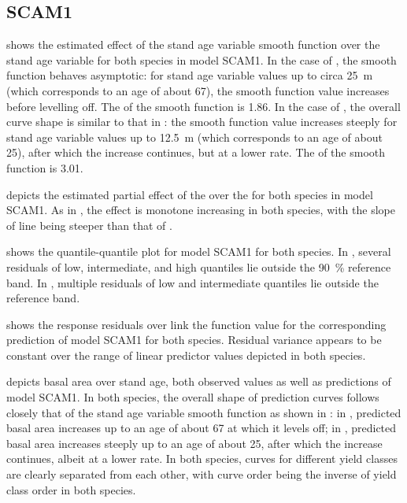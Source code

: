 \subsection{SCAM1}

 shows the estimated effect of the stand age variable smooth function over the stand age variable for both species in model SCAM1.  In the case of \Beech{}, the smooth function behaves asymptotic:  for stand age variable values up to circa \SI{25}{\meter} (which corresponds to an age of about \SI{67}{\year}), the smooth function value increases before levelling off.  The \edf{} of the smooth function is \num{1.86}.  In the case of \Spruce{}, the overall curve shape is similar to that in :  the smooth function value increases steeply for stand age variable values up to \SI{12.5}{\meter} (which corresponds to an age of about \SI{25}{\year}), after which the increase continues, but at a lower rate.  The \edf{} of the smooth function is \num{3.01}.

 depicts the estimated partial effect of the \ProductivityIndexVariableText{} over the \ProductivityIndexVariableText{} for both species in model SCAM1.  As in , the effect is monotone increasing in both species, with the slope of \Beech{} line being steeper than that of \Spruce{}.

 shows the quantile-quantile plot for model SCAM1 for both species.  In \Beech{}, several residuals of low, intermediate, and high quantiles lie outside the \SI{90}{\percent} reference band.  In \Spruce{}, multiple residuals of low and intermediate quantiles lie outside the reference band.

 shows the response residuals over link the function value for the corresponding prediction of model SCAM1 for both species.  Residual variance appears to be constant over the range of linear predictor values depicted in both species.

 depicts basal area over stand age, both observed values as well as predictions of model SCAM1.  In both species, the overall shape of prediction curves follows closely that of the stand age variable smooth function as shown in :  in \Beech{}, predicted basal area increases up to an age of about \SI{67}{\year} at which it levels off;  in \Spruce{}, predicted basal area increases steeply up to an age of about \SI{25}{\year}, after which the increase continues, albeit at a lower rate.  In both species, curves for different yield classes are clearly separated from each other, with curve order being the inverse of yield class order in both species.

